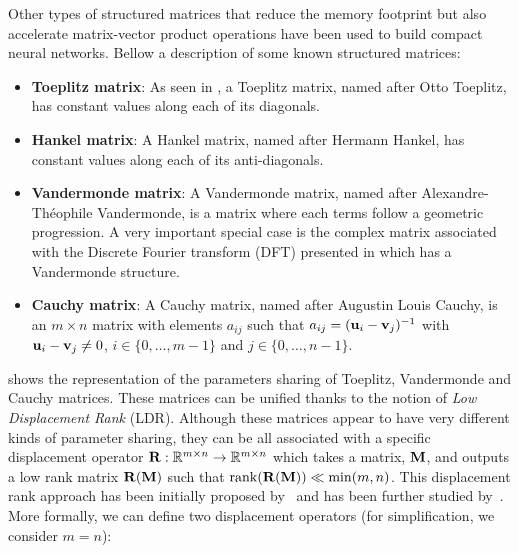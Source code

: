 \noindent
Other types of structured matrices that reduce the memory footprint but also accelerate matrix-vector product operations have been used to build compact neural networks.
Bellow a description of some known structured matrices: 
\begin{itemize}%
  \item \textbf{Toeplitz matrix}: As seen in , a Toeplitz matrix, named after Otto Toeplitz, has constant values along each of its diagonals.
  \item \textbf{Hankel matrix}: A Hankel matrix, named after Hermann Hankel, has constant values along each of its anti-diagonals.
  \item \textbf{Vandermonde matrix}: A Vandermonde matrix, named after Alexandre-Théophile Vandermonde, is a matrix where each terms follow a geometric progression.  
    A very important special case is the complex matrix associated with the Discrete Fourier transform (DFT) presented in  which has a Vandermonde structure.
  \item \textbf{Cauchy matrix}: A Cauchy matrix, named after Augustin Louis Cauchy, is an $m \times n$ matrix with elements $a_{ij}$ such that $a_{ij} = (\mathbf{u}_i - \mathbf{v}_j)^{-1}$ with $\mathbf{u}_i - \mathbf{v}_j \neq 0$, $i \in \{0,\dots,m-1\}$ and $j \in \{0,\dots,n-1\}$.
\end{itemize}
 shows the representation of the parameters sharing of Toeplitz, Vandermonde and Cauchy matrices.
These matrices can be unified thanks to the notion of \emph{Low Displacement Rank} (LDR).
Although these matrices appear to have very different kinds of parameter sharing, they can be all associated with a specific displacement operator $\mathbf{R}: \mathbb{R}^{m \times n} \rightarrow \mathbb{R}^{m \times n}$ which takes a matrix, $\mathbf{M}$, and outputs a low rank matrix $\mathbf{R}(\mathbf{M})$ such that $\rank(\mathbf{R}(\mathbf{M})) \ll \min(m,n)$.
This displacement rank approach has been initially proposed by~\citet{kailath1979displacement} and has been further studied by~\citet{kailath1995displacement,pan2001structured}.
More formally, we can define two displacement operators (for simplification, we consider $m = n$):
